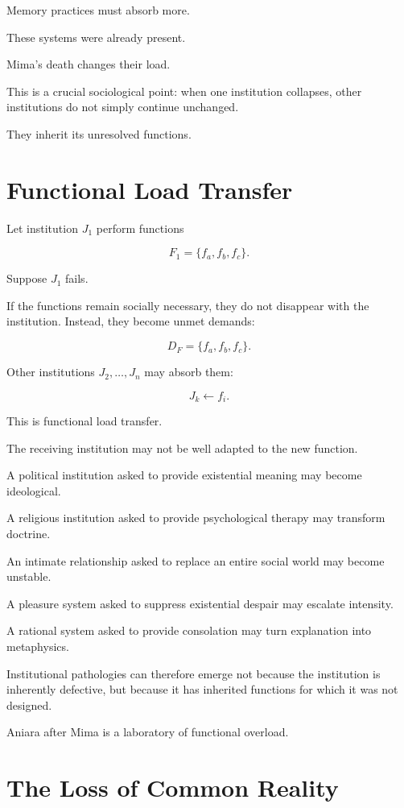\documentclass[11pt,oneside]{book}
\theoremstyle{definition}
\theoremstyle{remark}
\begin{document}
Memory practices must absorb more.

These systems were already present.

Mima's death changes their load.

This is a crucial sociological point: when one institution collapses, other institutions do not simply continue unchanged.

They inherit its unresolved functions.

\section{Functional Load Transfer}

Let institution \(J_1\) perform functions

\[
F_1=\{f_a,f_b,f_c\}.
\]

Suppose \(J_1\) fails.

If the functions remain socially necessary, they do not disappear with the institution. Instead, they become unmet demands:

\[
D_F
=
\{f_a,f_b,f_c\}.
\]

Other institutions \(J_2,\ldots,J_n\) may absorb them:

\[
J_k
\leftarrow
f_i.
\]

This is functional load transfer.

The receiving institution may not be well adapted to the new function.

A political institution asked to provide existential meaning may become ideological.

A religious institution asked to provide psychological therapy may transform doctrine.

An intimate relationship asked to replace an entire social world may become unstable.

A pleasure system asked to suppress existential despair may escalate intensity.

A rational system asked to provide consolation may turn explanation into metaphysics.

Institutional pathologies can therefore emerge not because the institution is inherently defective, but because it has inherited functions for which it was not designed.

Aniara after Mima is a laboratory of functional overload.

\section{The Loss of Common Reality}
\end{document}
